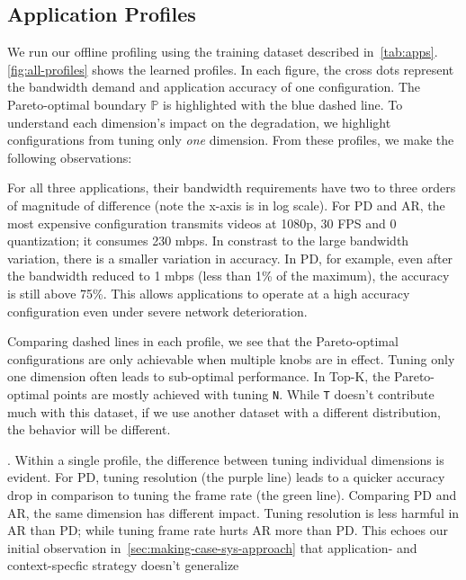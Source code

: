 \subsection{Application Profiles}
\label{sec:application-profiles}

We run our offline profiling using the training dataset described
in~\autoref{tab:apps}.  \autoref{fig:all-profiles} shows the learned
profiles. In each figure, the cross dots represent the bandwidth demand and
application accuracy of one configuration. The Pareto-optimal boundary
$\mathbb{P}$ is highlighted with the blue dashed line. To understand each
dimension's impact on the degradation, we highlight configurations from tuning
only \textit{one} dimension. From these profiles, we make the following
observations:

 For all three applications, their bandwidth
requirements have two to three orders of magnitude of difference (note the
x-axis is in log scale). For PD and AR, the most expensive configuration
transmits videos at 1080p, 30 FPS and 0 quantization; it consumes 230 mbps. In
constrast to the large bandwidth variation, there is a smaller variation in
accuracy. In PD, for example, even after the bandwidth reduced to 1 mbps (less
than 1\% of the maximum), the accuracy is still above 75\%. This allows
\sysname{} applications to operate at a high accuracy configuration even under
severe network deterioration.

 Comparing dashed lines in each
profile, we see that the Pareto-optimal configurations are only achievable when
multiple knobs are in effect. Tuning only one dimension often leads to
sub-optimal performance. In Top-K, the Pareto-optimal points are mostly achieved
with tuning \texttt{N}. While \texttt{T} doesn't contribute much with this
dataset, if we use another dataset with a different distribution, the behavior
will be different.

. Within a single profile, the
difference between tuning individual dimensions is evident. For PD, tuning
resolution (the purple line) leads to a quicker accuracy drop in comparison to
tuning the frame rate (the green line). Comparing PD and AR, the same dimension
has different impact. Tuning resolution is less harmful in AR than PD; while
tuning frame rate hurts AR more than PD. This echoes our initial observation
in~\autoref{sec:making-case-sys-approach} that application- and context-specfic
strategy doesn't generalize

